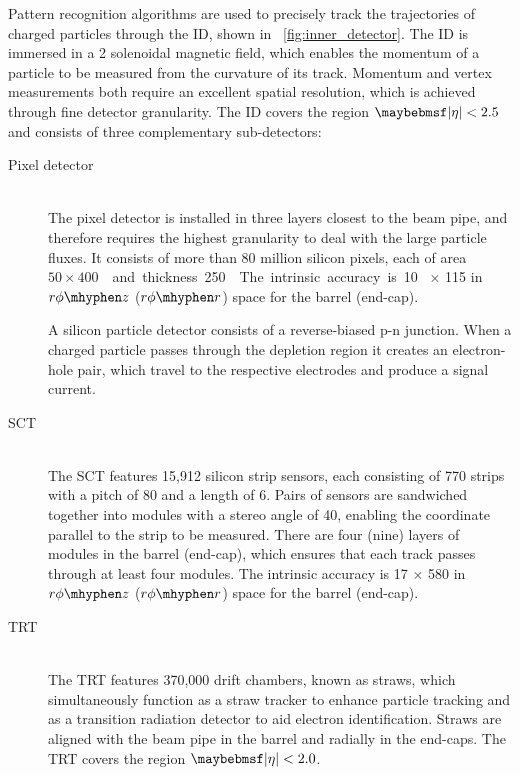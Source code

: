 Pattern recognition algorithms are used to precisely track the trajectories of charged 
particles through the \ac{ID}, shown in \Figure~\ref{fig:inner_detector}. The \ac{ID} is 
immersed in a \unit{2}{\tesla} solenoidal magnetic field, which enables the momentum of a 
particle to be measured from the curvature of its track. Momentum and vertex measurements
both require an excellent spatial resolution, which is achieved through fine detector 
granularity. The \ac{ID} covers the region $\mods{\eta} < 2.5$ and consists of three 
complementary sub-detectors:
\begin{description}
\item[Pixel detector] \hfill \\
	The pixel detector is installed in three layers closest to the beam pipe, and 
	therefore requires the highest granularity to deal with the large particle fluxes.
	It consists of more than 80 million silicon pixels, each of area 
	\unit{$50 \times 400$}{\micro\metre\squared} and thickness \unit{250}{\micro\metre}. 
	The intrinsic accuracy is \unit{10}{\micro\metre}$\,\times\,$\unit{115}{\micro\metre} 
	in $r\phi \mhyphen z$ ($r\phi \mhyphen r$) space for the barrel (end-cap).

	A silicon particle detector consists of a reverse-biased p-n junction. When a charged
	particle passes through the depletion region it creates an electron-hole pair, which 
	travel to the respective electrodes and produce a signal current.
\item[\ac{SCT}] \hfill \\
	The \ac{SCT} features 15,912 silicon strip sensors, each consisting of 770 strips 
	with a pitch of \unit{80}{\micro\metre} and a length of \unit{6}{\centi\metre}. Pairs 
	of sensors are sandwiched together into modules with a stereo angle of 
	\unit{40}{\milli\radian}, enabling the coordinate parallel to the strip to be 
	measured. There are four (nine) layers of modules in the barrel (end-cap), which 
	ensures that each track passes through at least four modules. 
	The intrinsic accuracy is \unit{17}{\micro\metre}$\,\times\,$\unit{580}{\micro\metre} 
	in $r\phi \mhyphen z$ ($r\phi \mhyphen r$) space for the barrel (end-cap).
\item[\ac{TRT}] \hfill \\
	The \ac{TRT} features 370,000 drift chambers, known as straws, which simultaneously 
	function as a straw tracker to enhance particle tracking and as a transition 
	radiation detector to aid electron identification. Straws are aligned with the beam 
	pipe in the barrel and radially in the end-caps. The \ac{TRT} covers the region 
	$\mods{\eta} < 2.0$.


\end{description}
